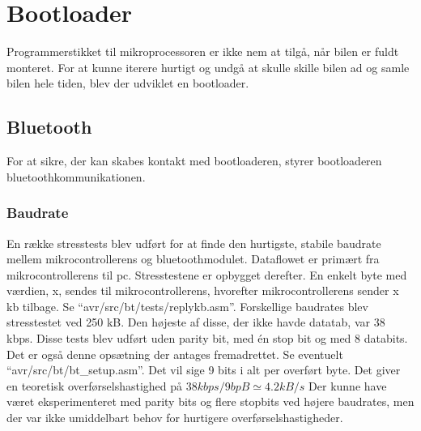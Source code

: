 \section{Bootloader}
Programmerstikket til mikroprocessoren er ikke nem at tilgå, når bilen er fuldt monteret. For at kunne iterere hurtigt og undgå at skulle skille bilen ad og samle bilen hele tiden, blev der udviklet en bootloader.

\subsection{Bluetooth}
For at sikre, der kan skabes kontakt med bootloaderen, styrer bootloaderen bluetoothkommunikationen.
\subsubsection{Baudrate}
En række stresstests blev udført for at finde den hurtigste, stabile baudrate mellem mikrocontrollerens og bluetoothmodulet. Dataflowet er primært fra mikrocontrollerens til pc. Stresstestene er opbygget derefter.
En enkelt byte med værdien, x, sendes til mikrocontrollerens, hvorefter mikrocontrollerens sender x kb tilbage.
Se ``avr/src/bt/tests/replykb.asm''.
Forskellige baudrates blev stresstestet ved 250 kB. Den højeste af disse, der ikke havde datatab, var 38 kbps. Disse tests blev udført uden parity bit, med én stop bit og med 8 databits. Det er også denne opsætning der antages fremadrettet. Se eventuelt ``avr/src/bt/bt\_setup.asm''. Det vil sige 9 bits i alt per overført byte. Det giver en teoretisk overførselshastighed på $38 kbps / 9 bpB \simeq 4.2 kB/s$ Der kunne have været eksperimenteret med parity bits og flere stopbits ved højere baudrates, men der var ikke umiddelbart behov for hurtigere overførselshastigheder.
